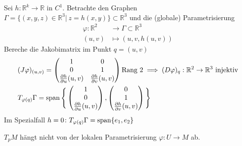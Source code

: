 \documentclass[../main.tex]{subfiles}
\begin{document}
\begin{example}
Sei $h : \mathbb{R}^k \to \mathbb{R}$ in $C^1$. Betrachte den Graphen $\Gamma = \{(x,y,z) \in \mathbb{R}^3 | \ z = h(x,y)\} \subset \mathbb{R}^3$ und die (globale) Parametrisierung
\begin{align*}
    \varphi : \mathbb{R}^2 & \to \Gamma \subset \mathbb{R}^3 \\
    (u,v) & \mapsto (u,v, h(u,v))
\end{align*}
Bereche die Jakobimatrix im Punkt $q=(u,v)$
\begin{align*}
    &(J\varphi)_{(u,v)}= \begin{pmatrix}1 & 0
        \\0 & 1
        \\ \frac{\partial h}{\partial u}(u,v) & \frac{\partial h}{\partial v}(u,v)\end{pmatrix}
    \text{Rang }2 \implies (D\varphi )_q : \mathbb{R}^2 \to \mathbb{R}^3 \text{ injektiv}\\
    & T_{\varphi(q)}\Gamma = \operatorname{span}\Bigg\{
        \begin{pmatrix}1 \\ 0 \\ \frac{\partial h}{\partial u}(u,v)\end{pmatrix},
        \begin{pmatrix}0 \\ 1 \\ \frac{\partial h}{\partial v}(u,v)\end{pmatrix}\Bigg\}
\end{align*}
Im Spezialfall $h=0 \colon T_{\varphi(q)}\Gamma = \operatorname{span}\{e_1, e_2\}$

\end{example}
\begin{lemma}
$T_pM$ hängt nicht von der lokalen Parametrisierung $\varphi : U \to M$ ab.
\end{lemma}
\end{document}
